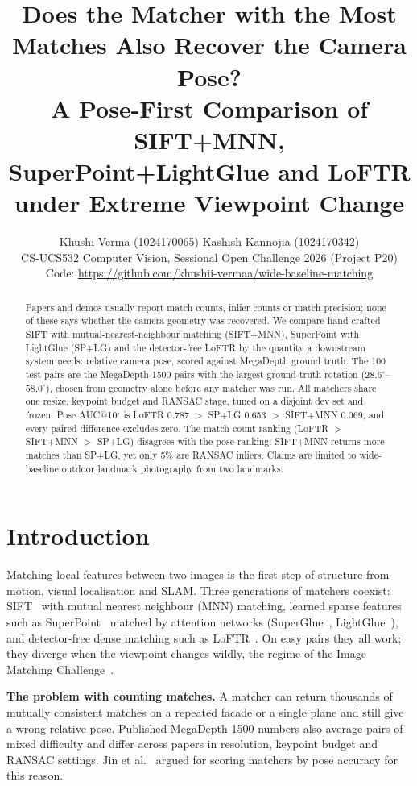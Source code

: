\documentclass[10pt,twocolumn,letterpaper]{article}
\title{Does the Matcher with the Most Matches Also Recover the Camera Pose?\\
A Pose-First Comparison of SIFT+MNN, SuperPoint+LightGlue and LoFTR\\under Extreme Viewpoint Change}
\author{Khushi Verma (1024170065) \quad Kashish Kannojia (1024170342)\\
CS-UCS532 Computer Vision, Sessional Open Challenge 2026 (Project P20)\\
Code: \url{https://github.com/khushii-vermaa/wide-baseline-matching}}
\date{}
\newcommand{\dg}{^{\circ}}
\begin{document}
\maketitle

\begin{abstract}
Papers and demos usually report match counts, inlier counts or match precision; none of these says whether the camera geometry was recovered.
We compare hand-crafted SIFT with mutual-nearest-neighbour matching (SIFT+MNN), SuperPoint with LightGlue (SP+LG) and the detector-free LoFTR by the quantity a downstream system needs: relative camera pose, scored against MegaDepth ground truth.
The 100 test pairs are the MegaDepth-1500 pairs with the largest ground-truth rotation ($28.6\dg$--$58.0\dg$), chosen from geometry alone before any matcher was run. All matchers share one resize, keypoint budget and RANSAC stage, tuned on a disjoint dev set and frozen.
Pose AUC@10$\dg$ is LoFTR 0.787 $>$ SP+LG 0.653 $>$ SIFT+MNN 0.069, and every paired difference excludes zero. The match-count ranking (LoFTR $>$ SIFT+MNN $>$ SP+LG) disagrees with the pose ranking: SIFT+MNN returns more matches than SP+LG, yet only 5\% are RANSAC inliers.
Claims are limited to wide-baseline outdoor landmark photography from two landmarks.
\end{abstract}

\section{Introduction}
Matching local features between two images is the first step of structure-from-motion, visual localisation and SLAM. Three generations of matchers coexist: SIFT~\cite{lowe} with mutual nearest neighbour (MNN) matching, learned sparse features such as SuperPoint~\cite{superpoint} matched by attention networks (SuperGlue~\cite{superglue}, LightGlue~\cite{lightglue}), and detector-free dense matching such as LoFTR~\cite{loftr}. On easy pairs they all work; they diverge when the viewpoint changes wildly, the regime of the Image Matching Challenge~\cite{imc}.

\noindent\textbf{The problem with counting matches.} A matcher can return thousands of mutually consistent matches on a repeated facade or a single plane and still give a wrong relative pose. Published MegaDepth-1500 numbers also average pairs of mixed difficulty and differ across papers in resolution, keypoint budget and RANSAC settings. Jin et al.~\cite{imc} argued for scoring matchers by pose accuracy for this reason.
\end{document}
